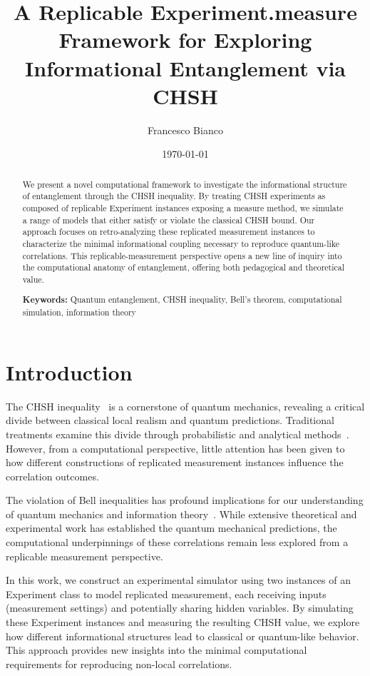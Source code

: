 \documentclass[11pt,a4paper]{article}
\begin{document}
\title{A Replicable Experiment.measure Framework for Exploring Informational Entanglement via CHSH}

\author{Francesco Bianco}

\date{\today}

\maketitle

\begin{abstract}
We present a novel computational framework to investigate the informational structure of entanglement through the CHSH inequality. By treating CHSH experiments as composed of replicable Experiment instances exposing a measure method, we simulate a range of models that either satisfy or violate the classical CHSH bound. Our approach focuses on retro-analyzing these replicated measurement instances to characterize the minimal informational coupling necessary to reproduce quantum-like correlations. This replicable-measurement perspective opens a new line of inquiry into the computational anatomy of entanglement, offering both pedagogical and theoretical value.

\textbf{Keywords:} Quantum entanglement, CHSH inequality, Bell's theorem, computational simulation, information theory
\end{abstract}

\section{Introduction}

The CHSH inequality~\cite{clauser1969} is a cornerstone of quantum mechanics, revealing a critical divide between classical local realism and quantum predictions. Traditional treatments examine this divide through probabilistic and analytical methods~\cite{bell1964}. However, from a computational perspective, little attention has been given to how different constructions of replicated measurement instances influence the correlation outcomes.

The violation of Bell inequalities has profound implications for our understanding of quantum mechanics and information theory~\cite{brassard2005}. While extensive theoretical and experimental work has established the quantum mechanical predictions, the computational underpinnings of these correlations remain less explored from a replicable measurement perspective.

In this work, we construct an experimental simulator using two instances of an Experiment class to model replicated measurement, each receiving inputs (measurement settings) and potentially sharing hidden variables. By simulating these Experiment instances and measuring the resulting CHSH value, we explore how different informational structures lead to classical or quantum-like behavior. This approach provides new insights into the minimal computational requirements for reproducing non-local correlations.
\end{document}
